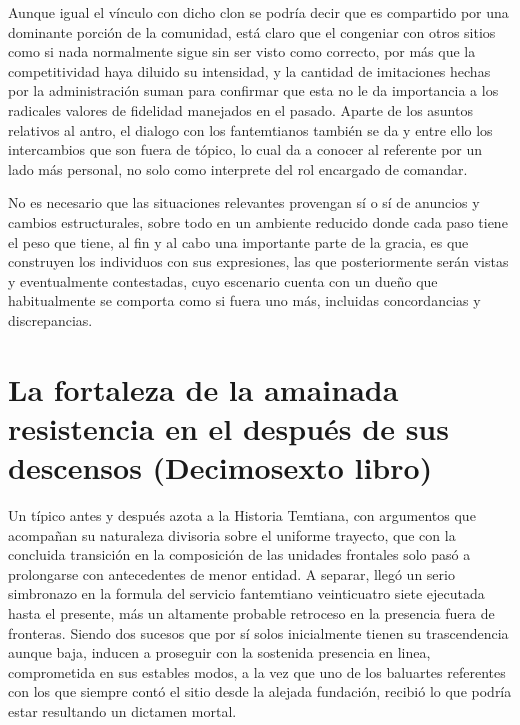 \documentclass[
]{book}
\begin{document}
Aunque igual el vínculo con dicho clon se podría decir que es compartido por una dominante porción de la comunidad, está claro que el congeniar con otros sitios como si nada normalmente sigue sin ser visto como correcto, por más que la competitividad haya diluido su intensidad, y la cantidad de imitaciones hechas por la administración suman para confirmar que esta no le da importancia a los radicales valores de fidelidad manejados en el pasado. Aparte de los asuntos relativos al antro, el dialogo con los fantemtianos también se da y entre ello los intercambios que son fuera de tópico, lo cual da a conocer al referente por un lado más personal, no solo como interprete del rol encargado de comandar.

No es necesario que las situaciones relevantes provengan sí o sí de anuncios y cambios estructurales, sobre todo en un ambiente reducido donde cada paso tiene el peso que tiene, al fin y al cabo una importante parte de la gracia, es que construyen los individuos con sus expresiones, las que posteriormente serán vistas y eventualmente contestadas, cuyo escenario cuenta con un dueño que habitualmente se comporta como si fuera uno más, incluidas concordancias y discrepancias.

\hypertarget{la-fortaleza-de-la-amainada-resistencia-en-el-despuuxe9s-de-sus-descensos-decimosexto-libro}{%
\chapter{La fortaleza de la amainada resistencia en el después de sus descensos (Decimosexto libro)}\label{la-fortaleza-de-la-amainada-resistencia-en-el-despuuxe9s-de-sus-descensos-decimosexto-libro}}

Un típico antes y después azota a la Historia Temtiana, con argumentos que acompañan su naturaleza divisoria sobre el uniforme trayecto, que con la concluida transición en la composición de las unidades frontales solo pasó a prolongarse con antecedentes de menor entidad. A separar, llegó un serio simbronazo en la formula del servicio fantemtiano veinticuatro siete ejecutada hasta el presente, más un altamente probable retroceso en la presencia fuera de fronteras. Siendo dos sucesos que por sí solos inicialmente tienen su trascendencia aunque baja, inducen a proseguir con la sostenida presencia en linea, comprometida en sus estables modos, a la vez que uno de los baluartes referentes con los que siempre contó el sitio desde la alejada fundación, recibió lo que podría estar resultando un dictamen mortal.
\end{document}
